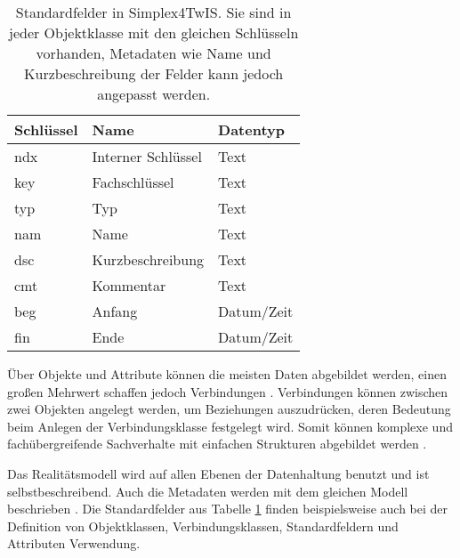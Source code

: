 \begin{table}[!ht]
  \centering
  \begin{tabular}{|| l | l | l ||}
    \hline
    Schlüssel & Name               & Datentyp   \\[0.5ex]
    \hline\hline
    ndx       & Interner Schlüssel & Text       \\
    key       & Fachschlüssel      & Text       \\
    typ       & Typ                & Text       \\
    nam       & Name               & Text       \\
    dsc       & Kurzbeschreibung   & Text       \\
    cmt       & Kommentar          & Text       \\
    beg       & Anfang             & Datum/Zeit \\
    fin       & Ende               & Datum/Zeit \\
    \hline
  \end{tabular}
  \caption[Standardfelder in Simplex4TwIS]{Standardfelder in Simplex4TwIS. Sie sind in jeder Objektklasse mit den gleichen Schlüsseln vorhanden, Metadaten wie Name und Kurzbeschreibung der Felder kann jedoch angepasst werden. \parencite{simplex4datagmbhSimplex4TwIS}}
  \label{tab:s4d-fields}
\end{table}

Über Objekte und Attribute können die meisten Daten abgebildet werden, einen großen Mehrwert schaffen jedoch Verbindungen \parencite{rudolfUmweltdatenIntelligenz2021}. Verbindungen können zwischen zwei Objekten angelegt werden, um Beziehungen auszudrücken, deren Bedeutung beim Anlegen der Verbindungsklasse festgelegt wird. Somit können komplexe und fachübergreifende Sachverhalte mit einfachen Strukturen abgebildet werden \parencite{grossmannFachsystemeSchemaevolution2024}.

Das Realitätsmodell wird auf allen Ebenen der Datenhaltung benutzt und ist selbstbeschreibend. Auch die Metadaten werden mit dem gleichen Modell beschrieben \parencite{grossmannFachsystemeSchemaevolution2024}. Die Standardfelder aus Tabelle \ref{tab:s4d-fields} finden beispielsweise auch bei der Definition von Objektklassen, Verbindungsklassen, Standardfeldern und Attributen Verwendung.
